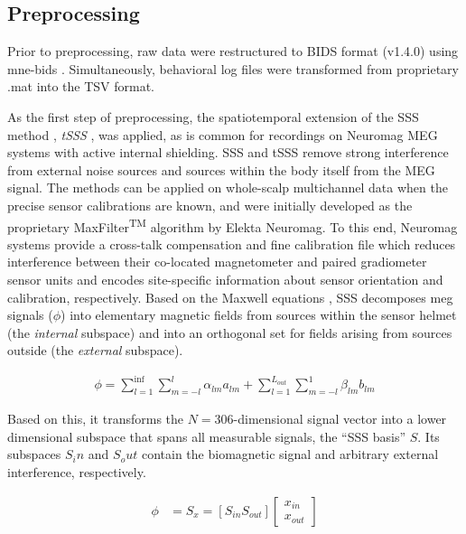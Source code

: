\subsection{Preprocessing}

Prior to preprocessing, raw data were restructured to \gls{BIDS} format (v1.4.0) using mne-bids \citep{Appelhoff2019}.
Simultaneously, behavioral log files were transformed from proprietary .mat into the TSV format.

As the first step of preprocessing, the spatiotemporal extension of the \gls{SSS} method \citep{taulu2005presentation}, \textit{\gls{tSSS}} \citep{taulu2006spatiotemporal}, was applied, as is common for recordings on Neuromag MEG systems with active internal shielding.
\gls{SSS} and \gls{tSSS} remove strong interference from external noise sources and sources within the body itself from the MEG signal.
The methods can be applied on whole-scalp multichannel data when the precise sensor calibrations are known, and were initially developed as the proprietary MaxFilter\textsuperscript{TM} algorithm by Elekta Neuromag.
To this end, Neuromag systems provide a cross-talk compensation and fine calibration file which reduces interference between their co-located magnetometer and paired gradiometer sensor units and encodes site-specific information about sensor orientation and calibration, respectively.
Based on the Maxwell equations \citep{taulu2006spatiotemporal}, \gls{SSS} decomposes \gls{meg} signals ($\phi$) into elementary magnetic fields from sources within the sensor helmet (the \textit{internal} subspace) and into an orthogonal set for fields arising from sources outside (the \textit{external} subspace).

\begin{equation}
	\begin{aligned}
	  \phi = \sum_{l=1}^{\inf}\sum_{m=-l}^{l} \alpha_{lm} a_{lm} + \sum_{l=1}^{L_{out}}\sum_{m=-l}^{1}\beta_{lm}b_{lm}
	\end{aligned}
\label{eq:sss}
\end{equation}

Based on this, it transforms the $N=306$-dimensional signal vector into a lower dimensional subspace that spans all measurable signals, the ``SSS basis'' $S$. Its subspaces $S_in$ and $S_out$ contain the biomagnetic signal and arbitrary external interference, respectively.

\begin{equation}
	\begin{aligned}
		    \phi &= S_x = [S_{in} S_{out}] \begin{bmatrix}
			x_{in} \\
			x_{out}
		\end{bmatrix}
	\end{aligned}
	\label{eq:sss}
\end{equation}

